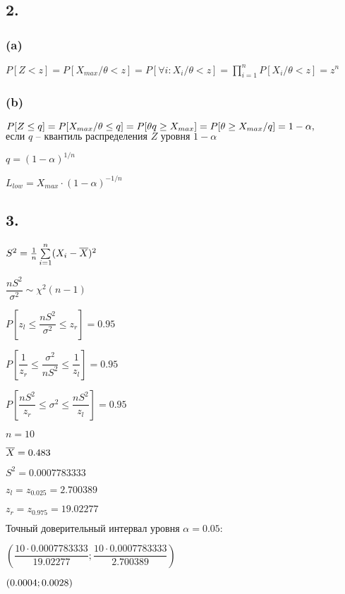 \documentclass[13pt,a4paper]{scrartcl}
\def\suml{\sum\limits}
\def\prodl{\prod\limits}
\def\A{\forall}
\def\t{\text}
\begin{document}
\subsection*{ 2.}

\def\Xm{X_{max}}
\def\t{\theta}

\subsubsection*{ (a)}

\(P[Z < z] = P[\Xm / \t < z] = P[\A i: X_i / \t < z] = \prodl_{i = 1}^{n} P[X_i / \t < z] = z^n\)

\subsubsection*{ (b)}

\(P[Z \le  q] = P[\Xm / \t \le  q] = P[\t q \ge  \Xm] = P[\t \ge  \Xm / q] = 1 - \alpha, \\\)
\(\text{если }\allowbreak q\text{ -- }\text{квантиль }\allowbreak \text{распределения }\allowbreak Z\text{ уровня }\allowbreak 1 - \alpha\)

\(q = (1 - \alpha)^{1 / n}\)

\(L_{low} = \Xm\cdot  (1 - \alpha)^{-1 / n}\)


\subsection*{ 3.}

\(S^2 = \frac{1 }{n} \suml_{i = 1}^{n} (X_i - \X)^2\)

\medskip
\(\dfrac{nS^2 }{\sigma^2} \sim  \chi^2(n - 1)\)

\medskip
\(P[ z_l \le  \dfrac{nS^2 }{\sigma^2 } \le  z_r ] = 0.95\)

\medskip
\(P[ \dfrac{1 }{z_r } \le  \dfrac{\sigma^2 }{nS^2 } \le  \dfrac{1 }{z_l } ] = 0.95\)

\medskip
\(P[ \dfrac{nS^2 }{z_r } \le  \sigma^2 \le  \dfrac{nS^2 }{z_l } ] = 0.95\)

\medskip
\(n = 10\)

\(\overline{X} = 0.483\)

\(S^2 = 0.0007783333\)

\(z_l = z_{0.025} = 2.700389\)

\(z_r = z_{0.975} = 19.02277\)

\medskip
\(\text{Точный }\allowbreak \text{доверительный }\allowbreak \text{интервал }\allowbreak \text{уровня }\allowbreak \alpha = 0.05:\)

\medskip
\(( \dfrac{10\cdot  0.0007783333 }{19.02277 }; \dfrac{10\cdot  0.0007783333 }{2.700389 } )\)

\medskip
\((0.0004; 0.0028) \\\)
\end{document}

